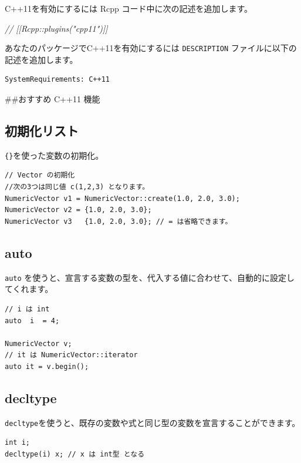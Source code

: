 \documentclass[]{book}
\newenvironment{Shaded}{\begin{snugshade}}{\end{snugshade}}
\newcommand{\CommentTok}[1]{\textcolor[rgb]{0.56,0.35,0.01}{\textit{#1}}}
\begin{document}
C++11を有効にするには Rcpp コード中に次の記述を追加します。

\begin{Shaded}
\begin{Highlighting}[]
\CommentTok{// [[Rcpp::plugins("cpp11")]]}
\end{Highlighting}
\end{Shaded}

あなたのパッケージでC++11を有効にするには \texttt{DESCRIPTION} ファイルに以下の記述を追加します。

\begin{verbatim}
SystemRequirements: C++11
\end{verbatim}

\#\#おすすめ C++11 機能

\subsection{初期化リスト}

\texttt{\{\}}を使った変数の初期化。

\begin{verbatim}
// Vector の初期化
//次の3つは同じ値 c(1,2,3) となります。
NumericVector v1 = NumericVector::create(1.0, 2.0, 3.0);
NumericVector v2 = {1.0, 2.0, 3.0};
NumericVector v3   {1.0, 2.0, 3.0}; // = は省略できます。
\end{verbatim}

\hypertarget{auto}{%
\subsection{auto}\label{auto}}

\texttt{auto} を使うと、宣言する変数の型を、代入する値に合わせて、自動的に設定してくれます。

\begin{verbatim}
// i は int
auto  i  = 4;

NumericVector v;
// it は NumericVector::iterator
auto it = v.begin();
\end{verbatim}

\hypertarget{decltype}{%
\subsection{decltype}\label{decltype}}

\texttt{decltype}を使うと、既存の変数や式と同じ型の変数を宣言することができます。

\begin{verbatim}
int i;
decltype(i) x; // x は int型 となる
\end{verbatim}
\end{document}
